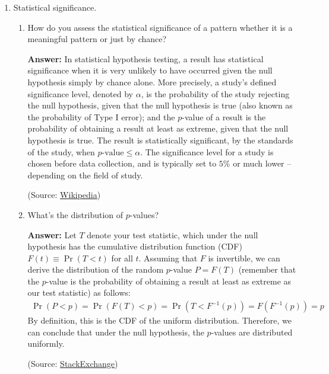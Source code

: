 \documentclass{article}
\newenvironment{QandA}{\begin{enumerate}[label=\arabic*.]}{\end{enumerate}}
\newenvironment{InnerQandA}{\begin{enumerate}[label=\roman*.]}{\end{enumerate}}
\newenvironment{answer}{\par\normalfont \textbf{Answer:}}{}
\begin{document}
\begin{QandA}
    \item Statistical significance.
    \begin{InnerQandA}
        \item How do you assess the statistical significance of a pattern whether it is a meaningful pattern or just by chance? 
        \begin{answer}
             In statistical hypothesis testing, a result has statistical significance when it is very unlikely to have occurred given the null hypothesis simply by chance alone. More precisely, a study's defined significance level, denoted by $\alpha$, is the probability of the study rejecting the null hypothesis, given that the null hypothesis is true (also known as the probability of Type I error); and the $p$-value of a result is the probability of obtaining a result at least as extreme, given that the null hypothesis is true. The result is statistically significant, by the standards of the study, when $p\text{-value} \le \alpha$. The significance level for a study is chosen before data collection, and is typically set to $5\%$ or much lower -- depending on the field of study. 
             
             (Source: \href{https://en.wikipedia.org/wiki/Statistical_significance}{Wikipedia})
        \end{answer}
        
        \item What’s the distribution of $p$-values?
        \begin{answer}
            Let $T$ denote your test statistic, which under the null hypothesis has the cumulative distribution function (CDF) $F(t) \equiv \Pr (T < t)$ for all $t$. Assuming that $F$ is invertible, we can derive the distribution of the random $p$-value $P = F(T)$ (remember that the $p$-value is the probability of obtaining a result at least as extreme as our test statistic) as follows:
            \begin{align*}
                \Pr (P < p) = \Pr (F(T) < p) = \Pr (T < F^{-1}(p)) = F(F^{-1}(p)) = p
            \end{align*}
            By definition, this is the CDF of the uniform distribution. Therefore, we can conclude that under the null hypothesis, the $p$-values are distributed uniformly. 
            
            (Source: \href{https://stats.stackexchange.com/a/345763}{StackExchange})
        \end{answer}


\end{InnerQandA}
\end{QandA}
\end{document}
